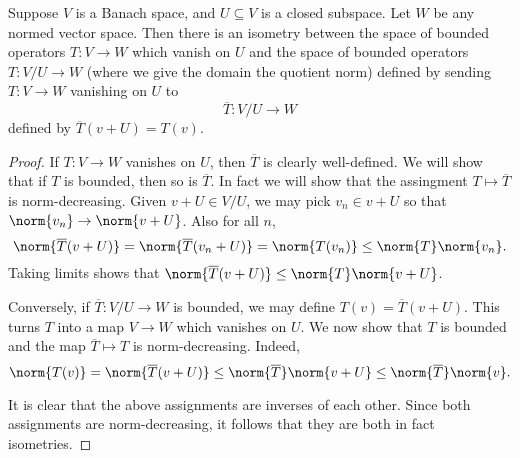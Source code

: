 \documentclass[12pt]{article}
\begin{document}
\begin{lem}\label{bounded}Suppose $V$ is a Banach space, and $U \subseteq V$ is a closed subspace. Let $W$ be any normed vector space. Then there is an isometry between the space of bounded operators $T:V\to W$ which vanish on $U$ and the space of bounded operators $T:V/U \to W$ (where we give the domain the quotient norm) defined by sending $T:V \to W$ vanishing on $U$ to
\[\overline{T}:V/U \to W\] defined by $\overline{T}(v+U) = T(v)$.\end{lem}
\begin{proof}If $T:V \to W$ vanishes on $U$, then $\overline{T}$ is clearly well-defined. We will show that if $T$ is bounded, then so is $\overline{T}$. In fact we will show that the assingment $T \mapsto \overline{T}$ is norm-decreasing. Given $v+U \in V/U$, we may pick $v_n \in v+U$ so that $\norm{v_n} \to \norm{v+U}$. Also for all $n$,
\[\norm{\overline{T}(v+U)} = \norm{\overline{T}(v_n+U)} = \norm{T(v_n)} \leq \norm{T}\norm{v_n}.\] Taking limits shows that $\norm{\overline{T}(v+U)} \leq \norm{T}\norm{v+U}$.

Conversely, if $\overline{T}:V/U \to W$ is bounded, we may define $T(v) = \overline{T}(v+U)$. This turns $T$ into a map $V \to W$ which vanishes on $U$. We now show that $T$ is bounded and the map $\overline{T} \mapsto T$ is norm-decreasing. Indeed,
\[\norm{T(v)} = \norm{\overline{T}(v+U)} \leq \norm{\overline{T}}\norm{v+U} \leq \norm{\overline{T}}\norm{v}.\]

It is clear that the above assignments are inverses of each other. Since both assignments are norm-decreasing, it follows that they are both in fact isometries.\end{proof}
\end{document}
